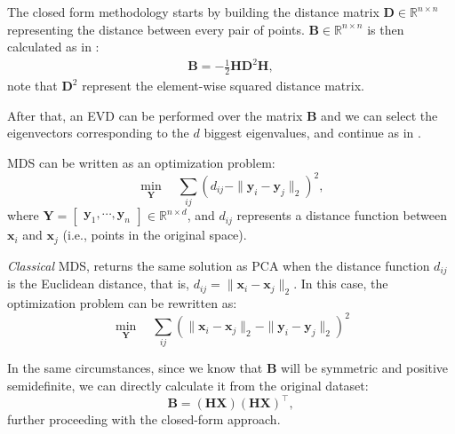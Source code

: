             The closed form methodology starts by building the distance matrix $\boldsymbol{D}\in\mathbb{R}^{n\times n}$ representing the distance between every pair of points. $\boldsymbol{B} \in \mathbb{R}^{n\times n}$ is then calculated as in :
            \begin{align} %
                \boldsymbol{B} = -\frac{1}{2}\boldsymbol{HD}^2\boldsymbol{H},
                \label{eq:MDSdissimilarityMatrix}
            \end{align}
            note that $\boldsymbol{D}^2$ represent the element-wise squared distance matrix.
            
            After that, an \ac{EVD} can be performed over the matrix $\boldsymbol{B}$ and we can select the eigenvectors corresponding to the $d$ biggest eigenvalues, and continue as in .
            
            \ac{MDS} can be written as an optimization problem:
            \begin{equation}
                \min_{\boldsymbol{Y}} \quad \sum_{ij} \left( 
                d_{ij} - \| \boldsymbol{y}_i - \boldsymbol{y}_j \|_2
                \right)^2,
                \label{form:MDS}
            \end{equation}
            where $\boldsymbol{Y}=\begin{bmatrix}\boldsymbol{y}_1, \cdots, \boldsymbol{y}_n\end{bmatrix}\in\mathbb{R}^{n\times d}$, and $d_{ij}$ represents a distance function between $\boldsymbol{x}_i$ and $\boldsymbol{x}_j$ (i.e., points in the original space).

            \textit{Classical} MDS, returns the same solution as \ac{PCA} when the distance function $d_{ij}$ is the Euclidean distance, that is, $d_{ij} = \|\boldsymbol{x}_i - \boldsymbol{x}_j \|_2$. In this case, the optimization problem can be rewritten as:
            \begin{equation}
                \min_{\boldsymbol{Y}} \quad \sum_{ij} \left( 
                \|\boldsymbol{x}_i - \boldsymbol{x}_j \|_2 - \| \boldsymbol{y}_i - \boldsymbol{y}_j \|_2
                \right)^2
            \end{equation}

            In the same circumstances, since we know that $\boldsymbol{B}$ will be symmetric and positive semidefinite, we can directly calculate it from the original dataset:
            \begin{equation}
                \boldsymbol{B} = \left( \boldsymbol{HX} \right) \left( \boldsymbol{HX} \right)^\top,
            \end{equation}
            further proceeding with the closed-form approach.

